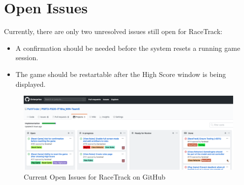 \section{Open Issues}
	Currently, there are only two unresolved issues still open for RaceTrack:
	\begin{itemize}
		 \item A confirmation should be needed before the system resets a running game session.
		 \item The game should be restartable after the High Score window is being displayed.
	\end{itemize}
	\begin{figure}[H]
		\centering
		\includegraphics[width=18cm,keepaspectratio,center]{img/Results_Open-Issues_Board.png}
		\caption{Current Open Issues for RaceTrack on GitHub}
	\end{figure}
